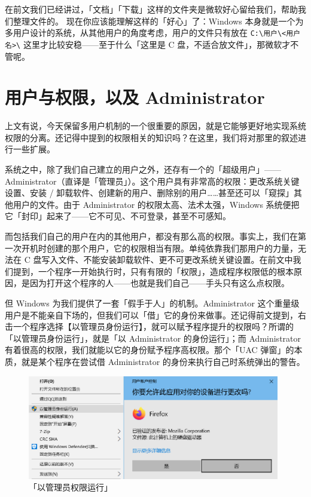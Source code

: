 在前文我们已经讲过，「文档」「下载」这样的文件夹是微软好心留给我们，帮助我们整理文件的。
现在你应该能理解这样的「好心」了：Windows 本身就是一个为多用户设计的系统，从其他用户的角度考虑，用户的文件只有放在 \verb|C:\用户\<用户名>\| 这里才比较安稳——至于什么「这里是 C 盘，不适合放文件」，那微软才不管呢。

\section{用户与权限，以及 Administrator}

上文有说，今天保留多用户机制的一个很重要的原因，就是它能够更好地实现系统权限的分离。还记得中提到的权限相关的知识吗？在这里，我们将对那里的叙述进行一些扩展。

系统之中，除了我们自己建立的用户之外，还存有一个的「超级用户」——Administrator（直译是「管理员」）。这个用户具有非常高的权限：更改系统关键设置、安装 / 卸载软件、创建新的用户、删除别的用户……甚至还可以「窥探」其他用户的文件。由于 Administrator 的权限太高、法术太强，Windows 系统便把它「封印」起来了——它不可见、不可登录，甚至不可感知。

而包括我们自己的用户在内的其他用户，都没有那么高的权限。事实上，我们在第一次开机时创建的那个用户，它的权限相当有限。单纯依靠我们那用户的力量，无法在 C 盘写入文件、不能安装卸载软件、更不可更改系统关键设置。在前文中我们提到，一个程序一开始执行时，只有有限的「权限」，造成程序权限低的根本原因，是因为打开这个程序的人——也就是我们自己——手头只有这么点权限。

但 Windows 为我们提供了一套「假手于人」的机制。Administrator 这个重量级用户是不能亲自下场的，但我们可以「借」它的身份来做事。还记得前文提到，右击一个程序选择【以管理员身份运行】，就可以赋予程序提升的权限吗？所谓的「以管理员身份运行」，就是「以 Administrator 的身份运行」；而 Administrator 有着很高的权限，我们就能以它的身份赋予程序高权限。那个「UAC 弹窗」的本质，就是某个程序在尝试借 Administrator 的身份来执行自己时系统弹出的警告。

\begin{figure}[htb!]
  \centering
  \includegraphics[width=11cm]{assets/Run_as_Admin.png}
  \caption{「以管理员权限运行」}
  \label{run-as-admin}
\end{figure}

